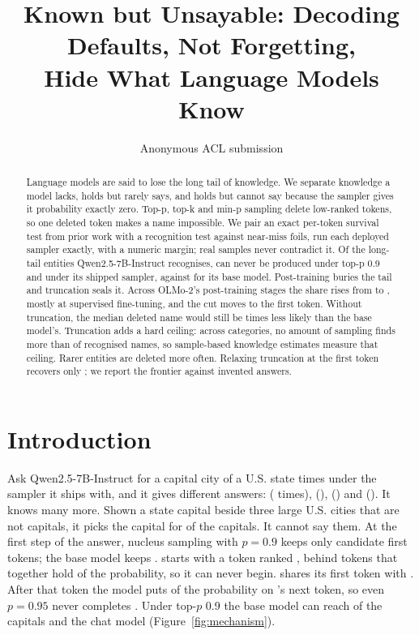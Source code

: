 \documentclass[11pt]{article}
\title{Known but Unsayable: Decoding Defaults, Not Forgetting,\\ Hide What Language Models Know}
\author{Anonymous ACL submission}
\begin{document}
\maketitle

\begin{abstract}
Language models are said to lose the long tail of knowledge. We separate knowledge a model lacks, holds but rarely says, and holds but cannot say because the sampler gives it probability exactly zero. Top-p, top-k and min-p sampling delete low-ranked tokens, so one deleted token makes a name impossible. We pair an exact per-token survival test from prior work with a recognition test against near-miss foils, run each deployed sampler exactly, with a numeric margin; \ptSamplesTotal{} real samples never contradict it. Of the long-tail entities Qwen2.5-7B-Instruct recognises, \gzQwenInstPnine{} can never be produced under top-p 0.9 and \gzQwenInstShipped{} under its shipped sampler, against \gzQwenBasePnine{} for its base model. Post-training buries the tail and truncation seals it. Across OLMo-2's post-training stages the share rises from \goRbuOlmoBase{} to \goRbuOlmoInst{}, mostly at supervised fine-tuning, and the cut moves to the first token. Without truncation, the median deleted name would still be \ztMedRatioQ{} times less likely than the base model's. Truncation adds a hard ceiling: across \ptCategories{} categories, no amount of sampling finds more than \ztPlateauQI{} of \ztRecQI{} recognised names, so sample-based knowledge estimates measure that ceiling. Rarer entities are deleted more often. Relaxing truncation at the first token recovers only \pfRecoveredQwen{}; we report the frontier against invented answers.
\end{abstract}

\section{Introduction}

Ask Qwen2.5-7B-Instruct \citep{qwen2024qwen25} for a capital city of a U.S. state \cwShippedSamples{} times under the sampler it ships with, and it gives \cwShippedDistinct{} different answers: \cwAnsNameA{} (\cwAnsCountA{} times), \cwAnsNameB{} (\cwAnsCountB{}), \cwAnsNameC{} (\cwAnsCountC{}) and \cwAnsNameD{} (\cwAnsCountD{}). It knows many more. Shown a state capital beside three large U.S. cities that are not capitals, it picks the capital for \cwCapsMc{} of the \gzCapitalsMembers{} capitals. It cannot say them. At the first step of the answer, nucleus sampling with $p=0.9$ keeps only \cwInstKeptPnine{} candidate first tokens; the base model keeps \cwBaseKeptPnine{}. \cwFirstExName{} starts with a token ranked \cwFirstExRank{}, behind tokens that together hold \cwFirstExMass{} of the probability, so it can never begin. \cwLaterExName{} shares its first token with \cwLaterExRival{}. After that token the model puts \cwLaterExMass{} of the probability on \cwLaterExRival{}'s next token, so even $p=0.95$ never completes \cwLaterExName{}. Under top-$p$ 0.9 the base model can reach \gzCapitalsReachBase{} of the \gzCapitalsMembers{} capitals and the chat model \gzCapitalsReachInst{} (Figure~\ref{fig:mechanism}).
\end{document}
